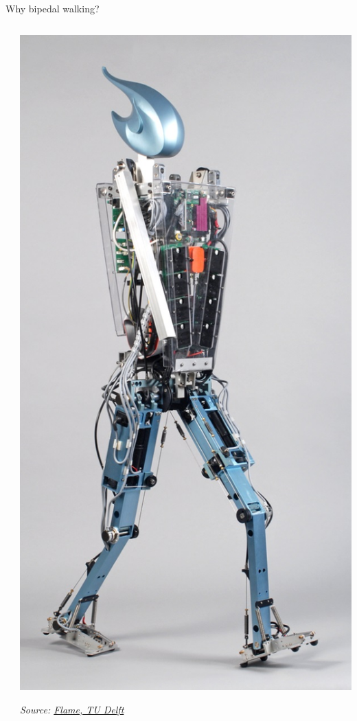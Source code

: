 \documentclass[compress]{beamer}
\newcommand{\source}[2]{{\tiny\it Source: \href{#1}{#2}}}
\begin{document}
\begin{frame}{Why bipedal walking?}
\begin{columns}
\begin{column}{0.5\linewidth}
        \end{column}
        \begin{column}{0.5\linewidth}
            \begin{center}
                \includegraphics[height=0.6\paperheight]{flame}
    
                \source{http://www.3me.tudelft.nl/en/about-the-faculty/departments/biomechanical-engineering/research/dbl-delft-biorobotics-lab/bipedal-robots/}{Flame, TU Delft}
            \end{center}
        \end{column}
    \end{columns}


\end{frame}
\end{document}
